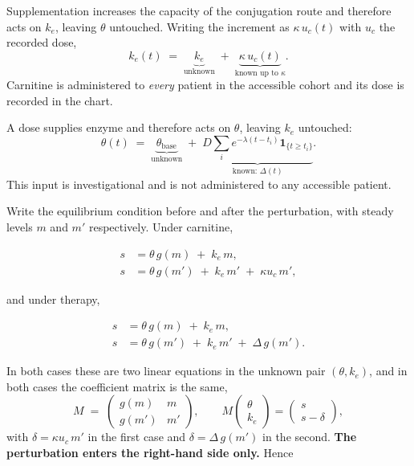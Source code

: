 \begin{description}[leftmargin=1.4em, itemsep=2pt]
\item[Carnitine.] Supplementation increases the capacity of the conjugation route and
therefore acts on $k_e$, leaving $\theta$ untouched. Writing the increment as
$\kappa\, u_c(t)$ with $u_c$ the recorded dose,
\begin{equation}
k_e(t) \;=\; \underbrace{k_e}_{\text{unknown}} \;+\;
\underbrace{\kappa\, u_c(t)}_{\text{known up to }\kappa} .
\label{eq:input_carn}
\end{equation}
Carnitine is administered to \emph{every} patient in the accessible cohort and its dose is
recorded in the chart.
\item[mRNA therapy.] A dose supplies enzyme and therefore acts on $\theta$, leaving $k_e$
untouched:
\begin{equation}
\theta(t) \;=\; \underbrace{\theta_{\mathrm{base}}}_{\text{unknown}}
\;+\; \underbrace{D \sum_i e^{-\lambda (t - t_i)} \mathbf{1}_{\{t \ge t_i\}}}_{\text{known: } \Delta(t)} .
\label{eq:input}
\end{equation}
This input is investigational and is not administered to any accessible patient.
\end{description}

Write the equilibrium condition before and after the perturbation, with steady levels $m$
and $m'$ respectively. Under carnitine,

\begin{equation}
\begin{aligned}
s &= \theta\, g(m) \;+\; k_e\, m, \\
s &= \theta\, g(m') \;+\; k_e\, m' \;+\; \kappa u_c\, m',
\end{aligned}
\label{eq:twoeq_carn}
\end{equation}

and under therapy,

\begin{equation}
\begin{aligned}
s &= \theta\, g(m) \;+\; k_e\, m, \\
s &= \theta\, g(m') \;+\; k_e\, m' \;+\; \Delta\, g(m') .
\end{aligned}
\label{eq:twoeq}
\end{equation}

In both cases these are two linear equations in the unknown pair $(\theta, k_e)$, and in
both cases the coefficient matrix is the same,
\begin{equation}
M \;=\;
\begin{pmatrix} g(m) & m \\[2pt] g(m') & m' \end{pmatrix} ,
\qquad
M \begin{pmatrix} \theta \\ k_e \end{pmatrix}
= \begin{pmatrix} s \\ s - \delta \end{pmatrix},
\label{eq:system}
\end{equation}
with $\delta = \kappa u_c\, m'$ in the first case and $\delta = \Delta\, g(m')$ in the
second. \textbf{The perturbation enters the right-hand side only.} Hence

